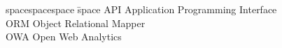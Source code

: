 
\begin{tabbing}
spacespacespace \= space \kill
API	 \> 	Application Programming Interface \\
ORM	 \> 	Object Relational Mapper \\
OWA	 \> 	Open Web Analytics	 \\
\end{tabbing}
\endinput
